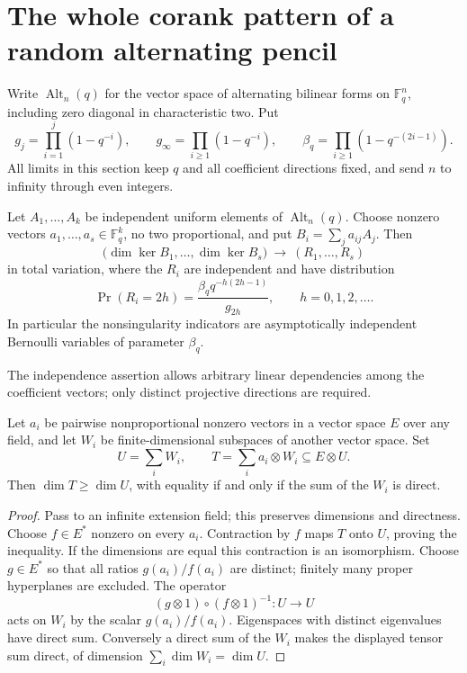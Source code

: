 \section{The whole corank pattern of a random alternating pencil}

Write $\operatorname{Alt}_n(q)$ for the vector space of alternating bilinear
forms on $\mathbb F_q^n$, including zero diagonal in characteristic two. Put
\[
 g_j=\prod_{i=1}^j(1-q^{-i}),\qquad
 g_\infty=\prod_{i\ge1}(1-q^{-i}),\qquad
 \beta_q=\prod_{i\ge1}(1-q^{-(2i-1)}).
\]
All limits in this section keep $q$ and all coefficient directions fixed,
and send $n$ to infinity through even integers.

\begin{theorem}
\label{thm:pencil-coranks}
Let $A_1,\ldots,A_k$ be independent uniform elements of
$\operatorname{Alt}_n(q)$. Choose nonzero vectors
$a_1,\ldots,a_s\in\mathbb F_q^k$, no two proportional, and put
$B_i=\sum_j a_{ij}A_j$. Then
\[
 \bigl(\dim\ker B_1,\ldots,\dim\ker B_s\bigr)
 \ \longrightarrow\ (R_1,\ldots,R_s)
\]
in total variation, where the $R_i$ are independent and have distribution
\[
 \Pr(R_i=2h)=\frac{\beta_q q^{-h(2h-1)}}{g_{2h}},
 \qquad h=0,1,2,\ldots.
\]
In particular the nonsingularity indicators are asymptotically independent
Bernoulli variables of parameter $\beta_q$.
\end{theorem}

The independence assertion allows arbitrary linear dependencies among the
coefficient vectors; only distinct projective directions are required.

\begin{lemma}
\label{lem:tensor-surplus}
Let $a_i$ be pairwise nonproportional nonzero vectors in a vector space $E$
over any field, and let $W_i$ be finite-dimensional subspaces of another
vector space. Set
\[
 U=\sum_iW_i,\qquad T=\sum_i a_i\otimes W_i\subseteq E\otimes U.
\]
Then $\dim T\ge\dim U$, with equality if and only if the sum of the $W_i$
is direct.
\end{lemma}

\begin{proof}
Pass to an infinite extension field; this preserves dimensions and directness.
Choose $f\in E^*$ nonzero on every $a_i$. Contraction by $f$ maps $T$ onto
$U$, proving the inequality. If the dimensions are equal this contraction
is an isomorphism. Choose $g\in E^*$ so that all ratios
$g(a_i)/f(a_i)$ are distinct; finitely many proper hyperplanes are excluded.
The operator
\[
 (g\otimes1)\circ(f\otimes1)^{-1}:U\longrightarrow U
\]
acts on $W_i$ by the scalar $g(a_i)/f(a_i)$. Eigenspaces with distinct
eigenvalues have direct sum. Conversely a direct sum of the $W_i$ makes the
displayed tensor sum direct, of dimension $\sum_i\dim W_i=\dim U$.
\end{proof}

